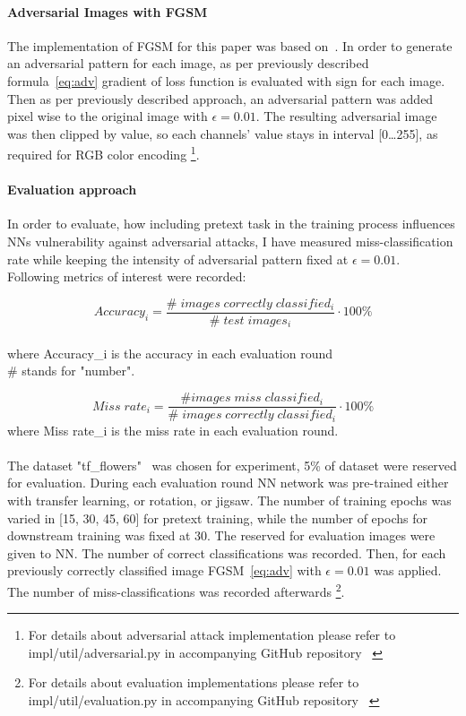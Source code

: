 \paragraph{Adversarial Images with FGSM}
The implementation of FGSM for this paper was based on~\cite{FGSM}.
In order to generate an adversarial pattern for each image, as per previously described formula~\ref{eq:adv}
gradient of loss function is evaluated with sign for each image.
Then as per previously described approach,
an adversarial pattern was added pixel wise to the original image with $\epsilon = 0.01$.
The resulting adversarial image was then clipped by value, so each channels' value stays in interval [0\ldots255],
as required for RGB color encoding
\footnote{For details about adversarial attack implementation please refer to
impl/util/adversarial.py in accompanying GitHub repository~\cite{github} \label{fn-adv}}.


\newpage
\paragraph{Evaluation approach}
In order to evaluate, how including pretext task in the training process influences NNs vulnerability against adversarial attacks,
I have measured miss-classification rate while keeping the intensity of adversarial pattern fixed at $\epsilon = 0.01$.
\\
Following metrics of interest were recorded:

\begin{equation}
    Accuracy_i = \frac{\# \; images \; correctly \; classified_i}{\# \; test \; images_i} \cdot 100 \%
\end{equation} \\
where Accuracy\_i is the accuracy in each evaluation round \\
\# stands for "number".

\begin{equation}
    Miss \; rate_i = \frac{\# images \; miss \; classified_i}{\# \; images \; correctly \; classified_i} \cdot 100 \%
\end{equation}
where Miss rate\_i is the miss rate in each evaluation round.
\\
\\
The dataset "tf\_flowers"~\cite{tfflowers} was chosen for experiment, 5\% of dataset were reserved for evaluation.
During each evaluation round NN network was pre-trained either with transfer learning, or rotation, or jigsaw.
The number of training epochs was varied in [15, 30, 45, 60] for pretext training, while the number of epochs for downstream
training was fixed at 30.
The reserved for evaluation images were given to NN. The number of correct classifications was recorded.
Then, for each previously correctly classified image FGSM~\ref{eq:adv} with $\epsilon = 0.01$ was applied.
The number of miss-classifications was recorded afterwards \footnote{For details about evaluation implementations please refer to
impl/util/evaluation.py in accompanying GitHub repository~\cite{github} \label{fn-eval}}.

